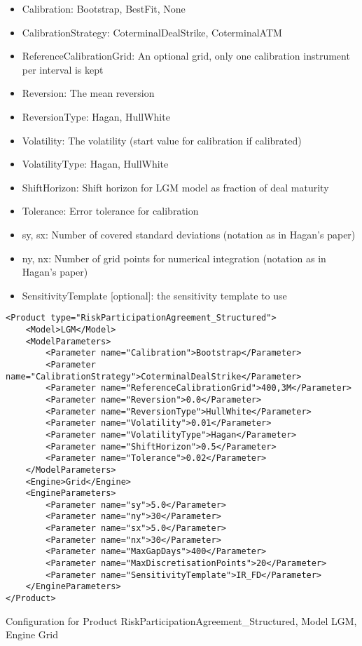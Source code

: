 \begin{itemize}
\item Calibration: Bootstrap, BestFit, None
\item CalibrationStrategy: CoterminalDealStrike, CoterminalATM
\item ReferenceCalibrationGrid: An optional grid, only one calibration instrument per interval is kept
\item Reversion: The mean reversion
\item ReversionType: Hagan, HullWhite
\item Volatility: The volatility (start value for calibration if calibrated)
\item VolatilityType: Hagan, HullWhite
\item ShiftHorizon: Shift horizon for LGM model as fraction of deal maturity
\item Tolerance: Error tolerance for calibration
\item sy, sx: Number of covered standard deviations (notation as in Hagan's paper)
\item ny, nx: Number of grid points for numerical integration (notation as in Hagan's paper)
\item SensitivityTemplate [optional]: the sensitivity template to use 
\end{itemize}

\begin{longlisting}
\begin{verbatim}
<Product type="RiskParticipationAgreement_Structured">
    <Model>LGM</Model>
    <ModelParameters>
        <Parameter name="Calibration">Bootstrap</Parameter>
        <Parameter name="CalibrationStrategy">CoterminalDealStrike</Parameter>
        <Parameter name="ReferenceCalibrationGrid">400,3M</Parameter>
        <Parameter name="Reversion">0.0</Parameter>
        <Parameter name="ReversionType">HullWhite</Parameter>
        <Parameter name="Volatility">0.01</Parameter>
        <Parameter name="VolatilityType">Hagan</Parameter>
        <Parameter name="ShiftHorizon">0.5</Parameter>
        <Parameter name="Tolerance">0.02</Parameter>
    </ModelParameters>
    <Engine>Grid</Engine>
    <EngineParameters>
        <Parameter name="sy">5.0</Parameter>
        <Parameter name="ny">30</Parameter>
        <Parameter name="sx">5.0</Parameter>
        <Parameter name="nx">30</Parameter>
        <Parameter name="MaxGapDays">400</Parameter>
        <Parameter name="MaxDiscretisationPoints">20</Parameter>
        <Parameter name="SensitivityTemplate">IR_FD</Parameter>
    </EngineParameters>
</Product>
\end{verbatim}
\caption{Configuration for Product RiskParticipationAgreement\_Structured, Model LGM, Engine Grid}
\label{lst:peconfig_RiskParticipationAgreement_Structured_LGM_Grid}
\end{longlisting}

